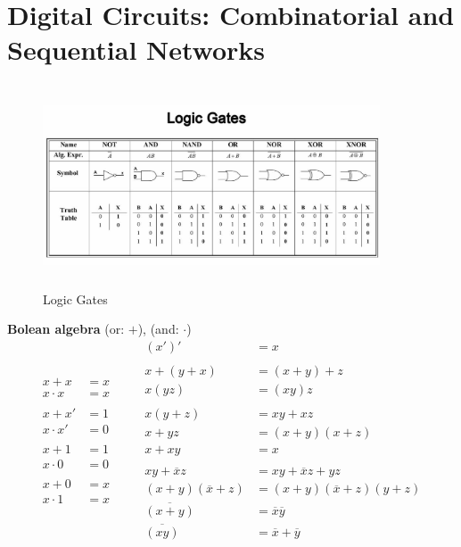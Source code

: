 \newpage
\section{Digital Circuits: Combinatorial and Sequential Networks}
\begin{figure}[h]
    \vspace{10mm}
    \centering
    \includegraphics[width=10cm, height=6cm]{image/logic-gates.jpeg}
    \caption{Logic Gates}
\end{figure}

\textbf{Bolean algebra}
(or: $+$), (and: $\cdot$)
\[
\begin{aligned}
  x + x       &= x \\
  x \cdot x   &= x \\
  &\quad   \\
  x + x'      &= 1 \\
  x \cdot x'  &= 0 \\
  &\quad   \\
  x + 1       &= 1 \\
  x \cdot 0   &= 0 \\
  &\quad   \\
  x + 0       &= x \\
  x \cdot 1   &= x \\
\end{aligned} \qquad
\begin{aligned}
  (x')'       &= x \\
  &\quad   \\
  x + (y + x) &= (x +y) + z \\
  x(yz)       &= (xy)z \\
  &\quad   \\
  x(y+z)      &= xy+xz \\
  x + yz      &= (x+y)(x+z)   \\
  x + xy      &= x  \\
  &\quad   \\
  xy+\overline{x}z &= xy+\overline{x}z +yz  \\
  (x+y)(\overline{x}+z) &= (x+y)(\overline{x}+z)(y+z)   \\
  \overline{(x+y)} &= \overline{x}\overline{y}  \\
  \overline{(xy)} &= \overline{x}+\overline{y}  \\
\end{aligned}
\] 

